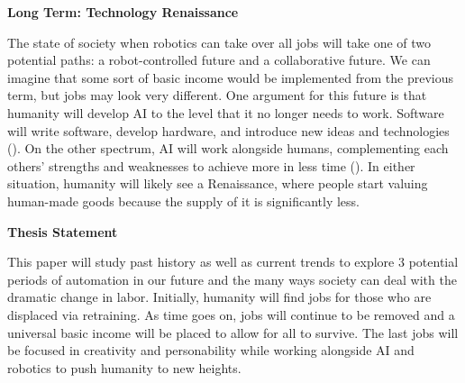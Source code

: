 \documentclass[12pt,letterpaper,man,natbib]{apa6}
\begin{document}
    \textbf{Long Term: Technology Renaissance}
    
    The state of society when robotics can take over all jobs will take one of two potential paths: a robot-controlled future and a collaborative future. We can imagine that some sort of basic income would be implemented from the previous term, but jobs may look very different. One argument for this future is that humanity will develop AI to the level that it no longer needs to work. Software will write software, develop hardware, and introduce new ideas and technologies (\cite{FutureOfAI}). On the other spectrum, AI will work alongside humans, complementing each others' strengths and weaknesses to achieve more in less time (\cite{AI_Humans_Future}). In either situation, humanity will likely see a Renaissance, where people start valuing human-made goods because the supply of it is significantly less.

    \textbf{Thesis Statement}

    This paper will study past history as well as current trends to explore 3 potential periods of automation in our future and the many ways society can deal with the dramatic change in labor. Initially, humanity will find jobs for those who are displaced via retraining. As time goes on, jobs will continue to be removed and a universal basic income will be placed to allow for all to survive. The last jobs will be focused in creativity and personability while working alongside AI and robotics to push humanity to new heights.

    
\end{document}

